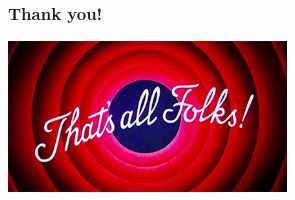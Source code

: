 \documentclass{beamer}
\begin{document}
\begin{frame}
\frametitle{Thank you!}
\begin{center}
\includegraphics[height = 4cm]{end.jpg}
\end{center}
\end{frame}
\end{document}
